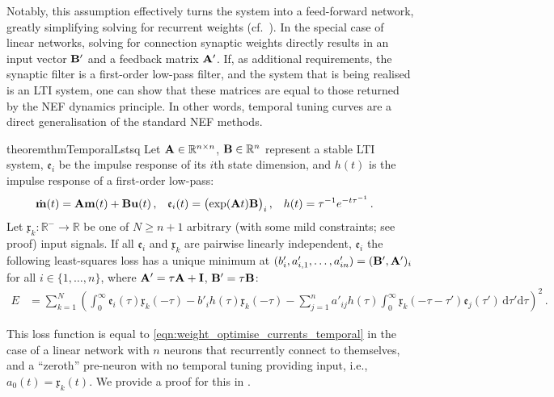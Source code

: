 Notably, this assumption effectively turns the system into a feed-forward network, greatly simplifying solving for recurrent weights (cf.~).
In the special case of linear networks, solving for connection synaptic weights directly results in an input vector $\mathbf{B}'$ and a feedback matrix $\mathbf{A}'$.
If, as additional requirements, the synaptic filter is a first-order low-pass filter, and the system that is being realised is an LTI system, one can show that these matrices are equal to those returned by the NEF dynamics principle.
In other words, temporal tuning curves are a direct generalisation of the standard NEF methods.

\begin{restatable}{theorem}{thmTemporalLstsq}
	\label{thm:temporal_lstsq}
	Let $\mathbf{A} \in \mathbb{R}^{n \times n}$, $\mathbf{B} \in \mathbb{R}^n$ represent a stable LTI system, $\mathfrak{e}_i$ be the impulse response of its $i$th state dimension, and $h(t)$ is the impulse response of a first-order low-pass:
	\begin{align*}
		  \dot{\mathbf{m}}(t) &= \mathbf{A} \mathbf{m}(t) + \mathbf{B} \mathbf{u}(t)  \,, 
		& \mathfrak{e}_i(t) &= \big(\!\exp( \mathbf{A} t ) \mathbf{B} \big)_i \,,
		& h(t) &= \tau^{-1} e^{-t \tau^{-1}} \,.
	\end{align*}
	Let $\mathfrak{x}_k : \mathbb{R}^- \to \mathbb{R}$ be one of $N \geq n + 1$ arbitrary (with some mild constraints; see proof) input signals.
	If all $\mathfrak{e}_i$ and $\mathfrak{x}_k$ are pairwise linearly independent, $\mathfrak{e}_i$ the following least-squares loss has a unique minimum at $(b'_{i}, a'_{i, 1}, \ldots, a'_{in}) = ( \mathbf{B}', \mathbf{A}' )_i$ for all $i \in \{1, \ldots, n\}$, where $\mathbf{A}' = \tau \mathbf{A} + \mathbf{I}$, $\mathbf{B}' = \tau \mathbf{B}$:
	\begin{align*}
		E &=\sum_{k = 1}^{N} \left(
					\int_{0}^{\infty} \!\! \mathfrak{e}_i(\tau) \mathfrak{x}_k(-\tau)
		          - b'_{i} h(\tau) \mathfrak{x}_k(-\tau)
		          - \sum_{j=1}^n a'_{ij} h(\tau) \int_0^\infty \!\! \mathfrak{x}_k(-\tau - \tau') \mathfrak{e}_j(\tau') \, \mathrm{d}\tau' \mathrm{d}\tau \right)^2 \,.
	\end{align*}
\end{restatable}
\noindent This loss function is equal to \cref{eqn:weight_optimise_currents_temporal} in the case of a linear network with $n$ neurons that recurrently connect to themselves, and a \enquote{zeroth} pre-neuron with no temporal tuning providing input, i.e., $a_0(t) = \mathfrak{x}_k(t)$.
We provide a proof for this in .

